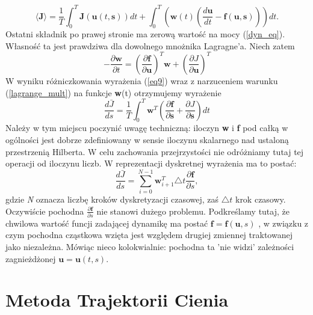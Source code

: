 \documentclass[12pt, twoside]{book}
\begin{document}
\begin{equation}\langle \textbf{J} \rangle = \frac{1}{T}\int_{0}^{T}\textbf{J}(\textbf{u}(t,\textbf{s}))dt + \int_{0}^{T}(\textbf{w}(t)(\frac{d\textbf{u}}{dt} -  \textbf{f}(\textbf{u},\textbf{s})))dt.
\label{eq9}
\end{equation}
Ostatni składnik po prawej stronie ma zerową wartość na mocy (\ref{dyn_eq}). Własność ta jest prawdziwa dla dowolnego mnożnika Lagragne'a. Niech zatem
\begin{equation}
-\frac{\partial{\textbf{w}}}{\partial{t}} = (\frac{\partial{\textbf{f}}}{\partial{\textbf{u}}})^{T}\textbf{w} +(\frac{\partial{J}}{\partial{\textbf{u}}})^{T} 
\label{lagrange_mult}
\end{equation}
W wyniku różniczkowania wyrażenia (\ref{eq9}) wraz z narzuceniem warunku (\ref{lagrange_mult}) na funkcje \textbf{w}(t) otrzymujemy wyrażenie
\begin{equation}
\frac{d\bar{J}}{ds} = \frac{1}{T}\int_{0}^{T}\textbf{w}^{T}(\frac{\partial{\textbf{f}}}{\partial{\textbf{s}}} + \frac{\partial{J}}{\partial{\textbf{s}}})dt
\end{equation} 
Należy w tym miejscu poczynić uwagę techniczną: iloczyn \textbf{w} i \textbf{f} pod całką w ogólności jest dobrze zdefiniowany w sensie iloczynu skalarnego nad ustaloną przestrzenią Hilberta. W celu zachowania przejrzystości nie odróżniamy tutaj tej operacji od iloczynu liczb. \newline
W reprezentacji dyskretnej wyrażenia ma to postać: 
\begin{equation}
\frac{d\bar{J}}{ds} = \sum_{i=0}^{N-1}\textbf{w}_{i+1}^T\triangle t\frac{\partial\textbf{f}}{\partial s},
\end{equation} 
gdzie \textit{N} oznacza liczbę kroków dyskretyzacji czasowej, zaś $ \triangle t $ krok czasowy. \newline
Oczywiście pochodna $ \frac{\partial \textbf{f}}{\partial s} $ nie stanowi dużego problemu. Podkreślamy tutaj, że chwilowa wartość funcji zadającej dynamikę ma postać $ \textbf{f} = \textbf{f}(\textbf{u}, s)$ , w związku z czym pochodna cząstkowa wzięta jest względem drugiej zmiennej traktowanej jako niezależna. Mówiąc nieco kolokwialnie: pochodna ta 'nie widzi' zależności zagnieżdżonej $ \textbf{u} = \textbf{u}(t,s) $. 
\newpage
\chapter{Metoda Trajektorii Cienia}
\end{document}
